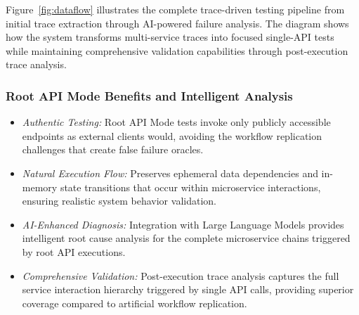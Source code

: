 \documentclass[conference]{IEEEtran}
\begin{document}
\noindent%
Figure~\ref{fig:dataflow} illustrates the complete trace-driven testing pipeline from initial trace extraction through AI-powered failure analysis.  The diagram shows how the system transforms multi-service traces into focused single-API tests while maintaining comprehensive validation capabilities through post-execution trace analysis.

\subsubsection*{Root API Mode Benefits and Intelligent Analysis}
\begin{itemize}[leftmargin=*]
  \item \emph{Authentic Testing:} Root API Mode tests invoke only publicly
        accessible endpoints as external clients would, avoiding the workflow
        replication challenges that create false failure oracles.
  \item \emph{Natural Execution Flow:} Preserves ephemeral data dependencies
        and in-memory state transitions that occur within microservice
        interactions, ensuring realistic system behavior validation.
  \item \emph{AI-Enhanced Diagnosis:} Integration with Large Language Models
        provides intelligent root cause analysis for the complete microservice
        chains triggered by root API executions.
  \item \emph{Comprehensive Validation:} Post-execution trace analysis captures
        the full service interaction hierarchy triggered by single API calls,
        providing superior coverage compared to artificial workflow replication.
\end{itemize}

\end{document}
